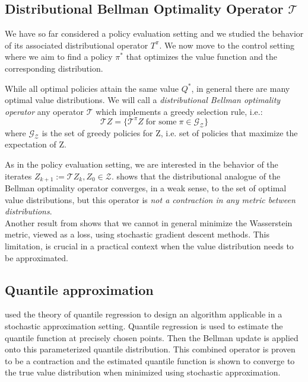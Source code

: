 \subsection{Distributional Bellman Optimality Operator $\mathcal{T}$}
We have so far considered a policy evaluation setting and we studied
the behavior of its associated distributional operator $T^\pi$.
We now move to the control setting where we aim to find a policy $\pi^{*}$ that optimizes the value function
and the 
corresponding distribution.

While all optimal policies attain the same value $Q^{*}$, in general there are
many optimal value distributions.
We will call a \textit{distributional Bellman optimality operator} any operator $\mathcal{T}$ 
which implements a greedy selection
rule, i.e.:
\begin{equation*}
    \mathcal{T}Z = \big\{ \mathcal{T}^\pi Z \; \text{for some}\; \pi \in   \mathcal{G_Z} \big\}
\end{equation*}
where $\mathcal{G_Z}$ is the set of greedy policies for Z, i.e. set of policies that maximize
the expectation of Z.

As in the policy evaluation setting, we are interested in the behavior of the iterates 
$Z_{k+1} := \mathcal{T}Z_k, Z_0 \in \mathcal{Z}$.
\citet{Bellemare2017} shows that the distributional analogue of the Bellman optimality operator converges, in a weak sense,
to the set of optimal value distributions, but
this operator is \textit{not a contraction in any metric between distributions}.\\
Another result from \citet{Bellemare2017} shows that we cannot in general minimize the Wasserstein metric, 
viewed as a loss, using stochastic gradient descent methods. This limitation, is crucial
in a practical context when the value distribution needs to be approximated.

\subsection{Quantile approximation} \label{sec:appendix_quantile_approximation}
\cite{Dabney2018a} used the theory of quantile regression \cite{koenker2005} to
design an algorithm applicable in a stochastic approximation setting.
Quantile regression is used to estimate the quantile function at precisely chosen points.
Then the Bellman update is applied onto this parameterized quantile distribution.
This combined operator is proven to be a contraction and the estimated quantile function
is shown to converge to the true value distribution when minimized using stochastic approximation.

